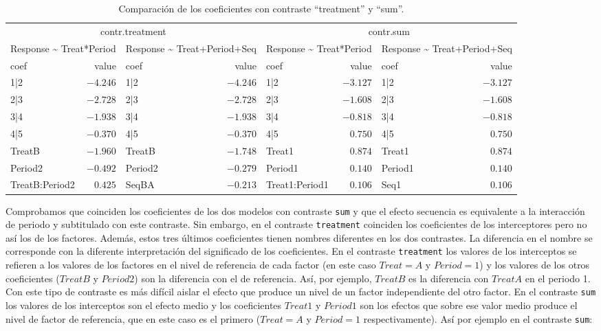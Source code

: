 \documentclass[
  12pt,
  a4paper,
  extrafontsizes,
  onecolumn,
  openright,
  table]{memoir}
\begin{document}
\hypertarget{tbl-contrast}{}
\begin{longtable}{lrlrlrlr}
\caption{\label{tbl-contrast}Comparación de los coeficientes con contraste ``treatment'' y ``sum''. }\tabularnewline

\toprule
\multicolumn{4}{c}{contr.treatment} & \multicolumn{4}{c}{contr.sum} \\ 
\cmidrule(lr){1-4} \cmidrule(lr){5-8}
\multicolumn{2}{c}{Response \textasciitilde{} Treat*Period} & \multicolumn{2}{c}{Response \textasciitilde{} Treat+Period+Seq} & \multicolumn{2}{c}{Response \textasciitilde{} Treat*Period} & \multicolumn{2}{c}{Response \textasciitilde{} Treat+Period+Seq} \\ 
\cmidrule(lr){1-2} \cmidrule(lr){3-4} \cmidrule(lr){5-6} \cmidrule(lr){7-8}
coef & value & coef & value & coef & value & coef & value \\ 
\midrule
1|2 & $-4.246$ & 1|2 & $-4.246$ & 1|2 & $-3.127$ & 1|2 & $-3.127$ \\ 
2|3 & $-2.728$ & 2|3 & $-2.728$ & 2|3 & $-1.608$ & 2|3 & $-1.608$ \\ 
3|4 & $-1.938$ & 3|4 & $-1.938$ & 3|4 & $-0.818$ & 3|4 & $-0.818$ \\ 
4|5 & $-0.370$ & 4|5 & $-0.370$ & 4|5 & $0.750$ & 4|5 & $0.750$ \\ 
TreatB & $-1.960$ & TreatB & $-1.748$ & Treat1 & $0.874$ & Treat1 & $0.874$ \\ 
Period2 & $-0.492$ & Period2 & $-0.279$ & Period1 & $0.140$ & Period1 & $0.140$ \\ 
TreatB:Period2 & $0.425$ & SeqBA & $-0.213$ & Treat1:Period1 & $0.106$ & Seq1 & $0.106$ \\ 
\bottomrule
\end{longtable}

\normalsize

Comprobamos que coinciden los coeficientes de los dos modelos con
contraste \texttt{sum} y que el efecto secuencia es equivalente a la
interacción de periodo y subtitulado con este contraste. Sin embargo, en
el contraste \texttt{treatment} coinciden los coeficientes de los
interceptores pero no así los de los factores. Además, estos tres
últimos coeficientes tienen nombres diferentes en los dos contrastes. La
diferencia en el nombre se corresponde con la diferente interpretación
del significado de los coeficientes. En el contraste \texttt{treatment}
los valores de los interceptos se refieren a los valores de los factores
en el nivel de referencia de cada factor (en este caso \(Treat = A\) y
\(Period = 1\)) y los valores de los otros coeficientes (\(TreatB\) y
\(Period2\)) son la diferencia con el de referencia. Así, por ejemplo,
\(TreatB\) es la diferencia con \(TreatA\) en el periodo 1. Con este
tipo de contraste es más difícil aislar el efecto que produce un nivel
de un factor independiente del otro factor. En el contraste \texttt{sum}
los valores de los interceptos son el efecto medio y los coeficientes
\(Treat1\) y \(Period1\) son los efectos que sobre ese valor medio
produce el nivel de factor de referencia, que en este caso es el primero
(\(Treat = A\) y \(Period = 1\) respectivamente). Así por ejemplo en el
contraste \texttt{sum}:
\end{document}
